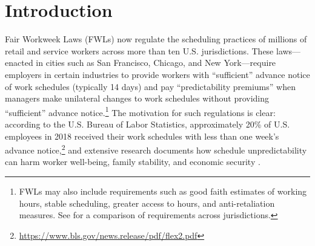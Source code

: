 \documentclass[letterpaper,11pt,leqno]{article}
\theoremstyle{paper}
\begin{document}
\section{Introduction} \label{sec:intro}
Fair Workweek Laws (FWLs) now regulate the scheduling practices of millions of retail and service workers across more than ten U.S. jurisdictions. These laws—enacted in cities such as San Francisco, Chicago, and New York—require employers in certain industries to provide workers with ``sufficient'' advance notice of work schedules (typically 14 days) and pay ``predictability premiums'' when managers make unilateral changes to work schedules without providing ``sufficient'' advance notice.\footnote{FWLs may also include requirements such as good faith estimates of working hours, stable scheduling, greater access to hours, and anti-retaliation measures. See \cite{fw_info} for a comparison of requirements across jurisdictions.} The motivation for such regulations is clear: according to the U.S. Bureau of Labor Statistics, approximately 20\% of U.S. employees in 2018 received their work schedules with less than one week's advance notice,\footnote{\url{https://www.bls.gov/news.release/pdf/flex2.pdf}} and extensive research documents how schedule unpredictability can harm worker well-being, family stability, and economic security \citep{henly_lambert_2014, clasp_2015, Lambert218, seattle_pp, ananant_emeryville}.
\end{document}
